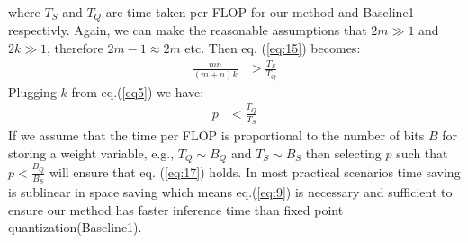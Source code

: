 where $T_S$ and $T_Q$ are time taken per FLOP for our method and Baseline1 respectivly.
Again, we can make the reasonable assumptions that $2m \gg 1$ and $2k \gg 1 $,
therefore $2m - 1 \approx 2m$ etc. Then eq. (\ref{eq:15}) becomes:
\begin{align} \label{eq:16}
\frac{mn}{(m + n) k} &> \frac{T_S}{T_Q}
\end{align}
Plugging $k$ from eq.(\ref{eq5}) we have: 
\begin{align}\label{eq:17}
p &< \frac{T_Q}{T_S} 
\end{align}
If we assume that the time per FLOP is proportional to the number of bits $B$
for storing a weight variable, e.g., $T_Q \sim B_Q$ and $T_S \sim B_S$ then
selecting $p$ such that $p < \frac{B_Q}{B_S} $ will ensure that
eq. (\ref{eq:17}) holds. In most practical scenarios time saving is sublinear
in space saving which means eq.(\ref{eq:9}) is necessary and sufficient to
ensure our method has faster inference time than fixed point quantization(Baseline1).
